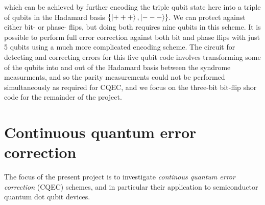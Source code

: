 \documentclass{report}
\begin{document}
which can be achieved by further encoding the triple qubit state here into a triple of qubits in the Hadamard basis $\{\ket{+++},\ket{---}\}$. We can protect against either bit- or phase- flips, but doing both requires nine qubits in this scheme. It is possible to perform full error correction against both bit and phase flips with just 5 qubits  using a much more complicated encoding scheme\cite{DiVincenzo1996}. The circuit for detecting and correcting errors for this five qubit code involves transforming some of the qubits into and out of the Hadamard basis between the syndrome measurments, and so the parity measurements could not be performed simultaneously as required for CQEC, and we focus on the three-bit bit-flip shor code for the remainder of the project.

\section{Continuous quantum error correction}\label{sec:CQEC}
The focus of the present project is to investigate \textit{continous quantum error correction} (CQEC) schemes, and in particular their application to semiconductor quantum dot qubit devices. 
\end{document}
